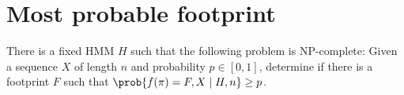 \section{Most probable footprint}
\label{sec:footprint}

\begin{theorem}
There is a fixed HMM $H$ such that the following problem is NP-complete:
Given a sequence $X$ of length $n$ and probability $p\in [0,1]$, determine
if there is a footprint $F$ such that $\prob{f(\pi)=F,X\mid H,n}\ge p$.
\label{thm:foot}
\end{theorem}

